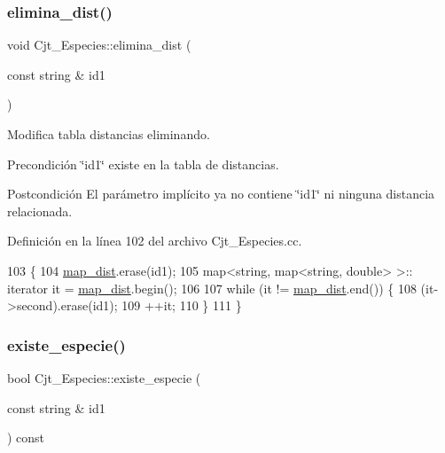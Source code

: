 \subsubsection{\texorpdfstring{elimina\+\_\+dist()}{elimina\_dist()}}
{\footnotesize\ttfamily void Cjt\+\_\+\+Especies\+::elimina\+\_\+dist (\begin{DoxyParamCaption}\item[{const string \&}]{id1 }\end{DoxyParamCaption})}



Modifica tabla distancias eliminando. 

\begin{DoxyPrecond}{Precondición}
\char`\"{}id1\char`\"{} existe en la tabla de distancias. 
\end{DoxyPrecond}
\begin{DoxyPostcond}{Postcondición}
El parámetro implícito ya no contiene \char`\"{}id1\char`\"{} ni ninguna distancia relacionada. 
\end{DoxyPostcond}


Definición en la línea 102 del archivo Cjt\+\_\+\+Especies.\+cc.


\begin{DoxyCode}
103 \{
104     \hyperlink{class_cjt___especies_a9b104014aea0c1472ba4e7d7fc785e9a}{map\_dist}.erase(id1);
105     map<string, map<string, double> >:: iterator it = \hyperlink{class_cjt___especies_a9b104014aea0c1472ba4e7d7fc785e9a}{map\_dist}.begin();
106 
107     \textcolor{keywordflow}{while} (it != \hyperlink{class_cjt___especies_a9b104014aea0c1472ba4e7d7fc785e9a}{map\_dist}.end()) \{
108         (it->second).erase(id1);
109         ++it;
110     \}
111 \}
\end{DoxyCode}
\mbox{\label{class_cjt___especies_a7500b2ef69fc99e66948ee4e34e60fb2}} 
\subsubsection{\texorpdfstring{existe\+\_\+especie()}{existe\_especie()}}
{\footnotesize\ttfamily bool Cjt\+\_\+\+Especies\+::existe\+\_\+especie (\begin{DoxyParamCaption}\item[{const string \&}]{id1 }\end{DoxyParamCaption}) const}



